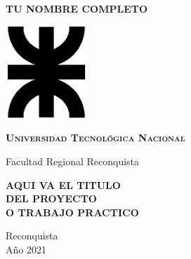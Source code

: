 \thispagestyle{empty}
\begin{center}
	
	{\huge{\textsc{\textbf{TU NOMBRE COMPLETO}}}}
	
	\vspace{2cm}
	
	\includegraphics[width=31mm,height=35mm]{imagenes/LogoUTN_nvgsb.eps}
	
	\vspace{2cm}
	
	{\Large{\textsc{\textbf{Universidad Tecnológica Nacional}}}}
	
	{\Large{Facultad Regional Reconquista}}
	
	\vspace{2cm}
	
	{\Large{\textsc{\textbf{AQUI VA EL TITULO \\ DEL PROYECTO  \\ O TRABAJO PRACTICO}}}}
	
	\vfill
	
	{\large{Reconquista\\Año 2021}}
\end{center}